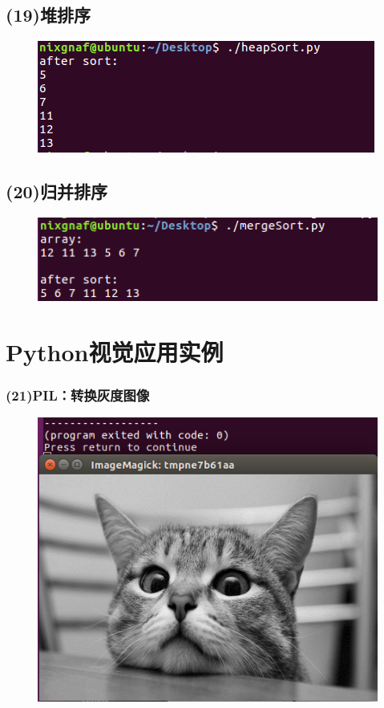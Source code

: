\documentclass{article}
\begin{document}
\subsection{(19)堆排序}

\begin{figure}[h]
    \centering
    \includegraphics[width=0.5\linewidth]{image23.png}
\end{figure}

\subsection{(20)归并排序}

\begin{figure}[h]
    \centering
    \includegraphics[width=0.5\linewidth]{image24.png}
\end{figure}

\section{Python视觉应用实例}

\subsubsection{(21)PIL：转换灰度图像}

\begin{figure}[h]
    \centering
    \includegraphics[width=0.5\linewidth]{image25.png}
\end{figure}
\end{document}
